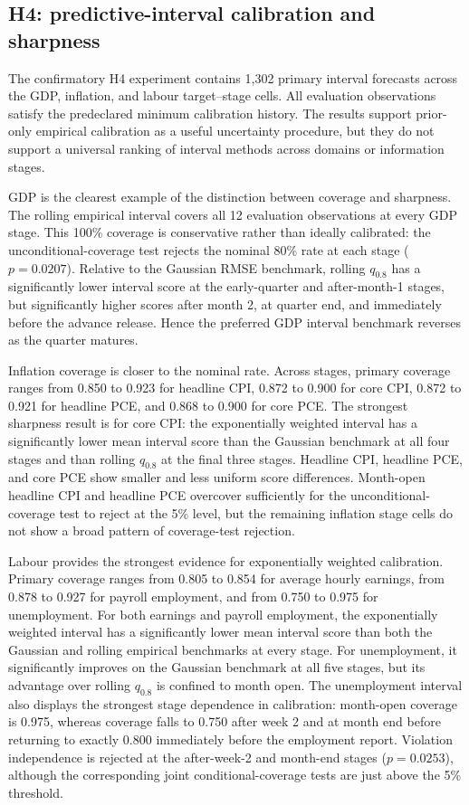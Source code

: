 \subsection{H4: predictive-interval calibration and sharpness}
\label{subsec:h4_results}

The confirmatory H4 experiment contains 1,302 primary interval forecasts
across the GDP, inflation, and labour target--stage cells.  All evaluation
observations satisfy the predeclared minimum calibration history.  The
results support prior-only empirical calibration as a useful uncertainty
procedure, but they do not support a universal ranking of interval methods
across domains or information stages.

GDP is the clearest example of the distinction between coverage and
sharpness.  The rolling empirical interval covers all 12 evaluation
observations at every GDP stage.  This 100\% coverage is conservative rather
than ideally calibrated: the unconditional-coverage test rejects the nominal
80\% rate at each stage (\(p=0.0207\)).  Relative to the Gaussian RMSE
benchmark, rolling \(q_{0.8}\) has a significantly lower interval score at
the early-quarter and after-month-1 stages, but significantly higher scores
after month 2, at quarter end, and immediately before the advance release.
Hence the preferred GDP interval benchmark reverses as the quarter matures.

Inflation coverage is closer to the nominal rate.  Across stages, primary
coverage ranges from 0.850 to 0.923 for headline CPI, 0.872 to 0.900 for core
CPI, 0.872 to 0.921 for headline PCE, and 0.868 to 0.900 for core PCE.
The strongest sharpness result is for core CPI: the exponentially weighted
interval has a significantly lower mean interval score than the Gaussian
benchmark at all four stages and than rolling \(q_{0.8}\) at the final three
stages.  Headline CPI, headline PCE, and core PCE show smaller and less
uniform score differences.  Month-open headline CPI and headline PCE
overcover sufficiently for the unconditional-coverage test to reject at the
5\% level, but the remaining inflation stage cells do not show a broad
pattern of coverage-test rejection.

Labour provides the strongest evidence for exponentially weighted calibration.  Primary
coverage ranges from 0.805 to 0.854 for average hourly earnings, from 0.878
to 0.927 for payroll employment, and from 0.750 to 0.975 for unemployment.
For both earnings and payroll employment, the exponentially weighted
interval has a significantly lower mean interval score than both the
Gaussian and rolling empirical benchmarks at every stage.  For unemployment,
it significantly improves on the Gaussian benchmark at all five stages, but
its advantage over rolling \(q_{0.8}\) is confined to month open.  The
unemployment interval also displays the strongest stage dependence in
calibration: month-open coverage is 0.975, whereas coverage falls to 0.750
after week 2 and at month end before returning to exactly 0.800 immediately
before the employment report.  Violation independence is rejected at the
after-week-2 and month-end stages (\(p=0.0253\)), although the corresponding
joint conditional-coverage tests are just above the 5\% threshold.

